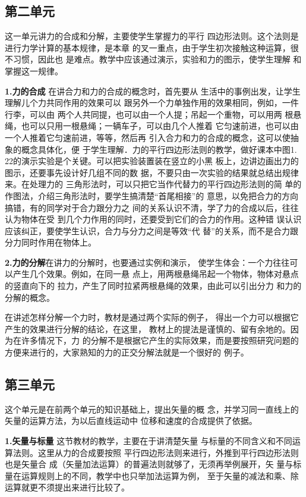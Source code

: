 \subsection{第二单元}
这一单元讲力的合成和分解，主要使学生掌握力的平行
四边形法则。这个法则是进行力学计算的基本规律，是本章
的叉一重点，由于学生初次接触这种运算，很不习惯，因此也
是难点。教学中应该通过演示，实验和力的图示，使学生理解
和掌握这一规律。

\textbf{1.力的合成}\quad  
在讲合力和力的合成的概念时，首先要从
生活中的事例出发，让学生理解儿个力共同作用的效果可以
跟另外一个力单独作用的效果相同，例如，一件行李，可以由
两个人共同提，也可以由一个人提；吊起一个重物，可以用两
根悬绳，也可以只用一根悬绳；一辆车子，可以由几个人推着
它匀速前进，也可以由一个人推着它匀速前进，等等，然后再
引入合力和力的合成的概念，这可以使抽象的概念具体化，便
于学生理解．力的平行四边形法则的教学，做好课本中图1.
22的演示实验是个关键。可以把实验装置装在竖立的小黑
板上，边讲边画出力的图示，还要事先设计好几组不同的数
据，不要只由一次实验的结果就总结出规律来。在处理力的
三角形法时，可以只把它当作代替力的平行四边形法则的简
单的作图法，介绍三角形法时，要学生搞清楚“首尾相接”的
意思，以免把合力的方向搞错，有的同学对于合力跟分力之
间的关系认识不清，学了力的合成以后，往往认为物体在受
到几个力作用的同时，还要受到它们的合力的作用。这种错
误认识应该纠正，要使学生认识，合力与分力之间是等效“代
替”的关系，而不是合力跟分力同时作用在物体上。

\textbf{2.力的分解}\quad   在讲力的分解时，也要通过实例和演示，
使学生体会：一个力往往可以产生几个效果。例如，在同一悬
点上，用两根悬绳吊起一个物体，物体对悬点的竖直向下的
拉力，产生了同时拉紧两根悬绳的效果，由此可以引出分力
和力的分解的概念。

在讲述怎样分解一个力时，教材是通过两个实际的例子，
得出一个力可以根据它产生的效果进行分解的结论，在这里，
教材上的提法是谨慎的、留有余地的。因为在许多情况下，力
的分解不是根据它产生的实际效果，而是要按照研究问题的
方便来进行的，大家熟知的力的正交分解法就是一个很好的
例子。

\subsection{第三单元}
这个单元是在前两个单元的知识基础上，提出矢量的概
念，并学习同一直线上的矢量的运算方法，为以后直线运动中
位移和速度的合成提供了依据。

\textbf{1.矢量与标量}\quad  
这节教材的教学，主要在于讲清楚矢量
与标量的不同含义和不同运算法则。这里从力的合成要按照
平行四边形法则来进行，外推到平行四边形法则也是矢量合
成（矢量加法运算）的普遍法则就够了，无须再举例展开，矢
量与标量在运算规则上的不同，教学中也只举加法运算为例，
至于矢量的减法和乘、除运算就更不须提出来进行比较了。

